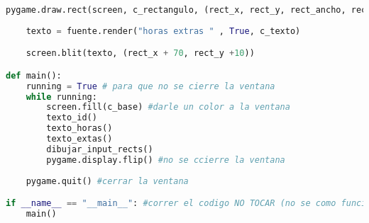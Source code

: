 \documentclass[a4paper,12pt]{article}
\begin{document}
\begin{itemize}
\begin{lstlisting}[language=Python]
    pygame.draw.rect(screen, c_rectangulo, (rect_x, rect_y, rect_ancho, rect_alto)) 
    
    texto = fuente.render("horas extras " , True, c_texto) 

    screen.blit(texto, (rect_x + 70, rect_y +10))

def main():
    running = True # para que no se cierre la ventana
    while running:
        screen.fill(c_base) #darle un color a la ventana
        texto_id()
        texto_horas()
        texto_extas()
        dibujar_input_rects()
        pygame.display.flip() #no se ccierre la ventana
        
    pygame.quit() #cerrar la ventana

if __name__ == "__main__": #correr el codigo NO TOCAR (no se como funciona)
    main()
    \end{lstlisting}
\end{itemize}
\end{document}
